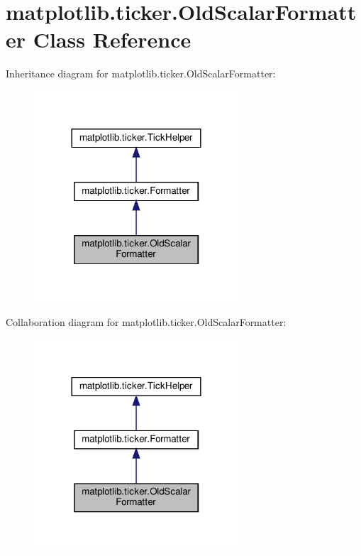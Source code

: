 \hypertarget{classmatplotlib_1_1ticker_1_1OldScalarFormatter}{}\section{matplotlib.\+ticker.\+Old\+Scalar\+Formatter Class Reference}
\label{classmatplotlib_1_1ticker_1_1OldScalarFormatter}


Inheritance diagram for matplotlib.\+ticker.\+Old\+Scalar\+Formatter\+:
\nopagebreak
\begin{figure}[H]
\begin{center}
\leavevmode
\includegraphics[width=216pt]{classmatplotlib_1_1ticker_1_1OldScalarFormatter__inherit__graph}
\end{center}
\end{figure}


Collaboration diagram for matplotlib.\+ticker.\+Old\+Scalar\+Formatter\+:
\nopagebreak
\begin{figure}[H]
\begin{center}
\leavevmode
\includegraphics[width=216pt]{classmatplotlib_1_1ticker_1_1OldScalarFormatter__coll__graph}
\end{center}
\end{figure}
